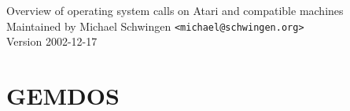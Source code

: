 \documentclass[a4paper]{article}
\begin{document}

{\Large Overview of operating system calls on Atari and compatible
  machines}\\
Maintained by Michael Schwingen {\tt <michael@schwingen.org>}\\
Version 2002-12-17

\section{GEMDOS}
\tablelasttail{\hline}
\raggedright
\end{document}
